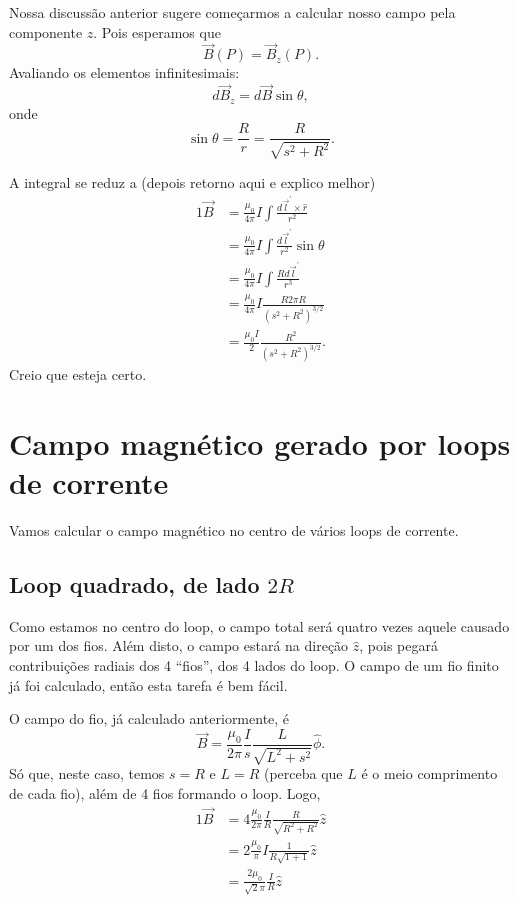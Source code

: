 \documentclass{article}
\newcommand{\rcaligrafico}{r}
\begin{document}
Nossa discussão anterior sugere começarmos a calcular nosso campo pela componente $z$. Pois esperamos que
\begin{equation}
 \vec{B}(P) = \vec{B}_z(P).
\end{equation}
Avaliando os elementos infinitesimais:
\begin{equation}
 d\vec{B}_z = d\vec{B} \sin{\theta},
\end{equation}
onde
\begin{equation}
 \sin{\theta} = \frac{R}{\rcaligrafico} = \frac{R}{\sqrt{s^2 + R^2}}.
\end{equation}

A integral se reduz a (depois retorno aqui e explico melhor)
\begin{alignat}{1}
 \vec{B} &= \frac{\mu_0}{4\pi} I \int \frac{d\vec{l}^{\prime} \times \hat{\rcaligrafico}}{\rcaligrafico^2}\\
 &= \frac{\mu_0}{4\pi} I \int \frac{d\vec{l}^{\prime}}{\rcaligrafico^2} \sin{\theta}\\
 &= \frac{\mu_0}{4\pi} I \int \frac{R d\vec{l}^{\prime}}{\rcaligrafico^3}\\
 &= \frac{\mu_0}{4\pi} I \frac{R 2\pi R}{(s^2 + R^2)^{3\slash 2}}\\
 &= \frac{\mu_0 I}{2} \frac{R^2}{(s^2 + R^2)^{3\slash 2}}.
\end{alignat}
Creio que esteja certo.

\section{Campo magnético gerado por loops de corrente}
Vamos calcular o campo magnético no centro de vários loops de corrente.
\subsection{Loop quadrado, de lado $2R$}
Como estamos no centro do loop, o campo total será quatro vezes aquele causado por um dos fios. Além disto, o campo estará na direção $\hat{z}$, pois pegará contribuições
radiais dos 4 ``fios'', dos 4 lados do loop. O campo de um fio finito já foi calculado, então esta tarefa é bem fácil.

O campo do fio, já calculado anteriormente, é
\begin{equation}
 \vec{B} = \frac{\mu_0}{2\pi} \frac{I}{s}\frac{L}{\sqrt{L^2 + s^2}} \hat{\phi}.
\end{equation}
Só que, neste caso, temos $s = R$ e $L = R$ (perceba que $L$ é o meio comprimento de cada fio), além de 4 fios formando o loop. Logo,
\begin{alignat}{1}
 \vec{B} &= 4 \frac{\mu_0}{2\pi} \frac{I}{R}\frac{R}{\sqrt{R^2 + R^2}} \hat{z}\\
 &= 2 \frac{\mu_0}{\pi} I\frac{1}{R\sqrt{1 + 1}} \hat{z}\\
 &= \frac{2\mu_0}{\sqrt{2}\pi} \frac{I}{R} \hat{z}
\end{alignat}
\end{document}
